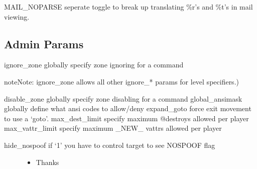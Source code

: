 \documentclass[letterpaper,10pt,english]{sphinxmanual}
\begin{document}
\sphinxAtStartPar
MAIL\_NOPARSE \sphinxhyphen{} seperate toggle to break up translating \%r’s and \%t’s in mail viewing.


\subsection{Admin Params}
\label{\detokenize{changelog:id45}}
\sphinxAtStartPar
ignore\_zone \sphinxhyphen{} globally specify zone ignoring for a command

\begin{sphinxadmonition}{note}{Note:}
\sphinxAtStartPar
ignore\_zone allows all other ignore\_* params for level specifiers.)
\end{sphinxadmonition}

\sphinxAtStartPar
disable\_zone \sphinxhyphen{} globally specify zone disabling for a command
global\_ansimask \sphinxhyphen{} globally define what ansi codes to allow/deny
expand\_goto \sphinxhyphen{} force exit movement to use a ‘goto’.
max\_dest\_limit \sphinxhyphen{} specify maximum @destroys allowed per player
max\_vattr\_limit \sphinxhyphen{} specify maximum \_NEW\_ vattrs allowed per player
\begin{description}
\item[{hide\_nospoof \sphinxhyphen{} if ‘1’ you have to control target to see NOSPOOF flag}] \leavevmode\begin{itemize}
\item {} 
\sphinxAtStartPar
Thanks 

\end{itemize}

\end{description}
\end{document}
